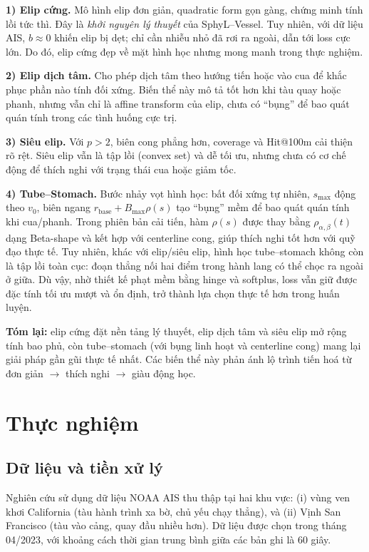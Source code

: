 \documentclass{IEEEtran}
\begin{document}
\textbf{1) Elip cứng.}  
Mô hình elip đơn giản, quadratic form gọn gàng, chứng minh tính lồi tức thì. 
Đây là \emph{khởi nguyên lý thuyết} của SphyL--Vessel. 
Tuy nhiên, với dữ liệu AIS, $b \approx 0$ khiến elip bị dẹt; 
chỉ cần nhiễu nhỏ đã rơi ra ngoài, dẫn tới loss cực lớn. 
Do đó, elip cứng đẹp về mặt hình học nhưng mong manh trong thực nghiệm.  

\textbf{2) Elip dịch tâm.}  
Cho phép dịch tâm theo hướng tiến hoặc vào cua để khắc phục phần nào tính đối xứng. 
Biến thể này mô tả tốt hơn khi tàu quay hoặc phanh, 
nhưng vẫn chỉ là affine transform của elip, 
chưa có ``bụng'' để bao quát quán tính trong các tình huống cực trị.  

\textbf{3) Siêu elip.}  
Với $p>2$, biên cong phẳng hơn, coverage và Hit@100m cải thiện rõ rệt. 
Siêu elip vẫn là tập lồi (convex set) và dễ tối ưu, 
nhưng chưa có cơ chế động để thích nghi với trạng thái cua hoặc giảm tốc.  

\textbf{4) Tube--Stomach.}  
Bước nhảy vọt hình học: bất đối xứng tự nhiên, $s_{\max}$ động theo $v_0$, 
biên ngang $r_{\text{base}}+B_{\max}\rho(s)$ tạo ``bụng'' mềm để bao quát quán tính khi cua/phanh. 
Trong phiên bản cải tiến, hàm $\rho(s)$ được thay bằng $\rho_{\alpha,\beta}(t)$ dạng Beta-shape 
và kết hợp với centerline cong, giúp thích nghi tốt hơn với quỹ đạo thực tế.  
Tuy nhiên, khác với elip/siêu elip, hình học tube--stomach không còn là tập lồi toàn cục: 
đoạn thẳng nối hai điểm trong hành lang có thể chọc ra ngoài ở giữa. 
Dù vậy, nhờ thiết kế phạt mềm bằng hinge và softplus, 
loss vẫn giữ được đặc tính tối ưu mượt và ổn định, 
trở thành lựa chọn thực tế hơn trong huấn luyện.  

\medskip
\noindent \textbf{Tóm lại:} 
elip cứng đặt nền tảng lý thuyết, 
elip dịch tâm và siêu elip mở rộng tính bao phủ, 
còn tube--stomach (với bụng linh hoạt và centerline cong) 
mang lại giải pháp gần gũi thực tế nhất. 
Các biến thể này phản ánh lộ trình tiến hoá từ đơn giản $\to$ thích nghi $\to$ giàu động học.




\section{Thực nghiệm}

\subsection{Dữ liệu và tiền xử lý}
Nghiên cứu sử dụng dữ liệu NOAA AIS thu thập tại hai khu vực: 
(i) vùng ven khơi California (tàu hành trình xa bờ, chủ yếu chạy thẳng), 
và (ii) Vịnh San Francisco (tàu vào cảng, quay đầu nhiều hơn). 
Dữ liệu được chọn trong tháng 04/2023, với khoảng cách thời gian trung bình giữa các bản ghi là 60 giây. 
\end{document}
